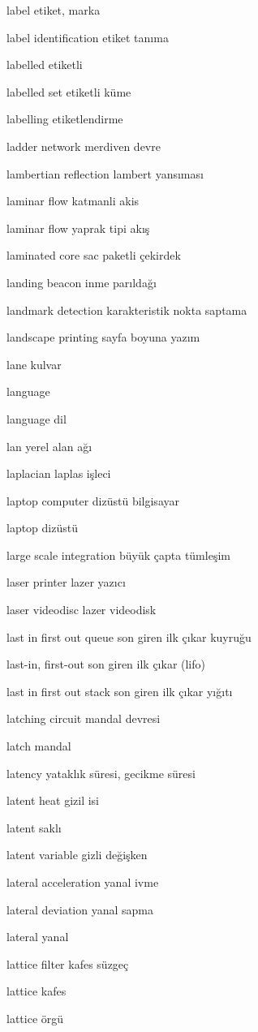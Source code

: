 \documentclass[12pt,fleqn]{article}\usepackage{../../common}
\begin{document}
label etiket, marka

label identification etiket tanıma

labelled etiketli

labelled set etiketli küme

labelling etiketlendirme

ladder network merdiven devre

lambertian reflection lambert yansıması

laminar flow katmanli akis

laminar flow yaprak tipi akış

laminated core sac paketli çekirdek

landing beacon inme parıldağı

landmark detection karakteristik nokta saptama

landscape printing sayfa boyuna yazım

lane kulvar

language

language dil

lan yerel alan ağı

laplacian laplas işleci

laptop computer dizüstü bilgisayar

laptop dizüstü

large scale integration büyük çapta tümleşim

laser printer lazer yazıcı

laser videodisc lazer videodisk

last in first out queue son giren ilk çıkar kuyruğu

last-in, first-out son giren ilk çıkar (lifo)

last in first out stack son giren ilk çıkar yığıtı

latching circuit mandal devresi

latch mandal

latency yataklık süresi, gecikme süresi

latent heat gizil isi

latent saklı

latent variable gizli değişken

lateral acceleration yanal ivme

lateral deviation yanal sapma

lateral yanal

lattice filter kafes süzgeç

lattice kafes

lattice örgü
\end{document}

